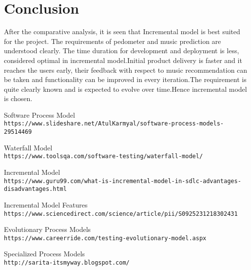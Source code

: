 \documentclass[10pt, a4paper]{article}
\begin{document}
\section{Conclusion}
After the comparative analysis, it is seen that Incremental model is best suited for the project. The requirements of pedometer and music prediction are understood clearly. The time duration for development and deployment is less, considered optimal in incremental model.Initial product delivery is faster and it reaches the users early, their feedback with respect to music recommendation can be taken and functionality can be improved in every iteration.The requirement is quite clearly known and is expected to evolve over time.Hence incremental model is chosen.

\begin{thebibliography}{9} 

\bibitem{} Software Process Model \\\texttt{https://www.slideshare.net/AtulKarmyal/software-process-models-29514469
}

\bibitem{} Waterfall Model \\\texttt{https://www.toolsqa.com/software-testing/waterfall-model/}

\bibitem{}Incremental Model \\\texttt{https://www.guru99.com/what-is-incremental-model-in-sdlc-advantages-disadvantages.html}

\bibitem{} Incremental Model Features \\\texttt{https://www.sciencedirect.com/science/article/pii/S0925231218302431}

\bibitem{}Evolutionary Process Models
\\\texttt{https://www.careerride.com/testing-evolutionary-model.aspx}

\bibitem{} Specialized Process Models
\\\texttt{http://sarita-itsmyway.blogspot.com/} 

\end{thebibliography}

\printbibliography
\end{document}
